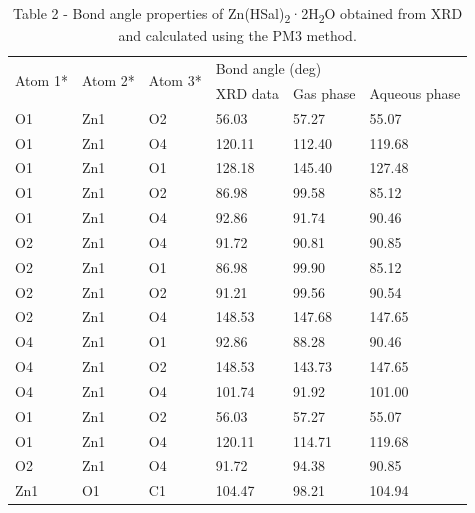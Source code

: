 \begin{table}[H]
\caption{Table 2 - Bond angle properties of Zn(HSal)\textsubscript{2}·2H\textsubscript{2}O obtained from XRD and calculated using the PM3 method.}
\centering
\begin{tabular}{|l|l|l|lll|}
\hline
\multirow{2}{*}{Atom 1*} & \multirow{2}{*}{Atom 2*} & \multirow{2}{*}{Atom 3*} & \multicolumn{3}{l|}{Bond 				angle (deg)} \\ \cline{4-6} 
 &  &  & \multicolumn{1}{l|}{XRD data} & \multicolumn{1}{l|}{Gas phase} & Aqueous phase \\ \hline
O1 & Zn1 & O2 & \multicolumn{1}{l|}{56.03} & \multicolumn{1}{l|}{57.27} & 55.07 \\ \hline
O1 & Zn1 & O4 & \multicolumn{1}{l|}{120.11} & \multicolumn{1}{l|}{112.40} & 119.68 \\ \hline
O1 & Zn1 & O1 & \multicolumn{1}{l|}{128.18} & \multicolumn{1}{l|}{145.40} & 127.48 \\ \hline
O1 & Zn1 & O2 & \multicolumn{1}{l|}{86.98} & \multicolumn{1}{l|}{99.58} & 85.12 \\ \hline
O1 & Zn1 & O4 & \multicolumn{1}{l|}{92.86} & \multicolumn{1}{l|}{91.74} & 90.46 \\ \hline
O2 & Zn1 & O4 & \multicolumn{1}{l|}{91.72} & \multicolumn{1}{l|}{90.81} & 90.85 \\ \hline
O2 & Zn1 & O1 & \multicolumn{1}{l|}{86.98} & \multicolumn{1}{l|}{99.90} & 85.12 \\ \hline
O2 & Zn1 & O2 & \multicolumn{1}{l|}{91.21} & \multicolumn{1}{l|}{99.56} & 90.54 \\ \hline
O2 & Zn1 & O4 & \multicolumn{1}{l|}{148.53} & \multicolumn{1}{l|}{147.68} & 147.65 \\ \hline
O4 & Zn1 & O1 & \multicolumn{1}{l|}{92.86} & \multicolumn{1}{l|}{88.28} & 90.46 \\ \hline
O4 & Zn1 & O2 & \multicolumn{1}{l|}{148.53} & \multicolumn{1}{l|}{143.73} & 147.65 \\ \hline
O4 & Zn1 & O4 & \multicolumn{1}{l|}{101.74} & \multicolumn{1}{l|}{91.92} & 101.00 \\ \hline
O1 & Zn1 & O2 & \multicolumn{1}{l|}{56.03} & \multicolumn{1}{l|}{57.27} & 55.07 \\ \hline
O1 & Zn1 & O4 & \multicolumn{1}{l|}{120.11} & \multicolumn{1}{l|}{114.71} & 119.68 \\ \hline
O2 & Zn1 & O4 & \multicolumn{1}{l|}{91.72} & \multicolumn{1}{l|}{94.38} & 90.85 \\ \hline
Zn1 & O1 & C1 & \multicolumn{1}{l|}{104.47} & \multicolumn{1}{l|}{98.21} & 104.94 \\ \hline

\end{tabular}
\end{table}
